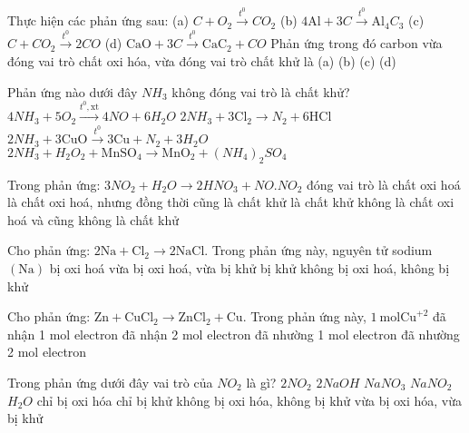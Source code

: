 \begin{ex}Thực hiện các phản ứng sau:
	(a) $C+O_2\xrightarrow{t^0} CO_2$
	(b) $4\mathrm{Al}+3C\xrightarrow{t^0} \mathrm{Al}_4C_3$
	(c) $C+CO_2\xrightarrow{t^0} 2CO$
	(d) $\mathrm{CaO}+3C\xrightarrow{t^0} \mathrm{CaC}_2+CO$
	Phản ứng trong đó carbon vừa đóng vai trò chất oxi hóa, vừa đóng vai trò chất khử là
	\choice
	{(a)}
	{(b)}
	{(c)}
	{\True (d)}
	\loigiai{}
\end{ex}

\begin{ex}Phản ứng nào dưới đây $NH_3$ không đóng vai trò là chất khử?
	\choice
	{$4 NH_3+5 O_2 \xrightarrow{t^0, \mathrm{xt}} 4 NO+6 H_2O$}
	{$2NH_3+3\mathrm{Cl}_2\to N_2+6\mathrm{HCl}$}
	{$2 NH_3+3 \mathrm{CuO} \xrightarrow{t^0} 3 \mathrm{Cu}+N_2+3 H_2O$}
	{\True $2 NH_3+H_2O_2+\mathrm{MnSO}_4 \to \mathrm{MnO}_2+\left(NH_4\right)_2 SO_4$}
	\loigiai{}
\end{ex}

\begin{ex}Trong phản ứng: $3 NO_2+H_2O \to 2 HNO_3+NO. NO_2$ đóng vai trò
	\choice
	{là chất oxi hoá}
	{là chất oxi hoá, nhưng đồng thời cũng là chất khử}
	{là chất khử}
	{\True không là chất oxi hoá và cũng không là chất khử}
	\loigiai{}
\end{ex}

\begin{ex}Cho phản ứng: $2\mathrm{Na}+\mathrm{Cl}_2\to 2\mathrm{NaCl}$. Trong phản ứng này, nguyên tử sodium $(\mathrm{Na})$
	\choice
	{bị oxi hoá}
	{vừa bị oxi hoá, vừa bị khử}
	{bị khử}
	{\True không bị oxi hoá, không bị khử}
	\loigiai{}
\end{ex}

\begin{ex}Cho phản ứng: $\mathrm{Zn}+\mathrm{CuCl}_2\to \mathrm{ZnCl}_2+\mathrm{Cu}$. Trong phản ứng này, $1\mathrm{~mol} \mathrm{Cu}^{+2}$
	\choice
	{đã nhận 1 mol electron}
	{\True đã nhận 2 mol electron}
	{đã nhường 1 mol electron}
	{đã nhường 2 mol electron}
	\loigiai{}
\end{ex}

\begin{ex}Trong phản ứng dưới đây vai trò của $NO_2$ là gì?
	$2NO_2$ \explus $2NaOH$ \MuiTen $NaNO_3$ \explus $NaNO_2$ \explus $H_2O$
	\choice
	{\True chỉ bị oxi hóa}
	{chỉ bị khử}
	{không bị oxi hóa, không bị khử}
	{vừa bị oxi hóa, vừa bị khử}
	\loigiai{}
\end{ex}

